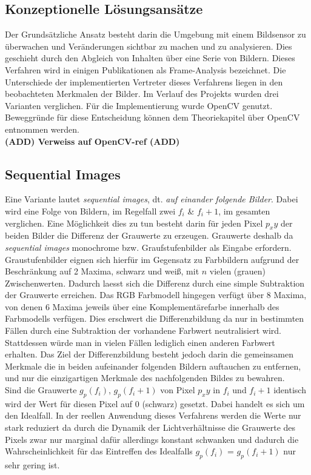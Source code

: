 		\subsection{Konzeptionelle Lösungsansätze}
		Der Grundsätzliche Ansatz besteht darin die Umgebung mit einem Bildsensor zu überwachen und Veränderungen sichtbar zu machen und zu analysieren. Dies geschieht durch den Abgleich von Inhalten über eine Serie von Bildern. Dieses Verfahren wird in einigen Publikationen als Frame-Analysis bezeichnet. Die Unterschiede der implementierten Vertreter dieses Verfahrens liegen in den beobachteten Merkmalen der Bilder. Im Verlauf des Projekts wurden drei Varianten verglichen. Für die Implementierung wurde OpenCV genutzt. Beweggründe für diese Entscheidung können dem Theoriekapitel über OpenCV entnommen werden.\\
		\textbf{(ADD) Verweiss auf OpenCV-ref (ADD)}
		\subsection{Sequential Images}
		Eine Variante lautet \textit{sequential images}, dt. \textit{auf einander folgende Bilder}. Dabei wird eine Folge von Bildern, im Regelfall zwei $f_i$ \& $f_i+1$, im gesamten verglichen. Eine Möglichkeit dies zu tun besteht darin für jeden Pixel $p_xy$ der beiden Bilder die Differenz der Grauwerte zu erzeugen. Grauwerte deshalb da \textit{sequential images} monochrome bzw. Graufstufenbilder als Eingabe erfordern. Graustufenbilder eignen sich hierfür im Gegensatz zu Farbbildern aufgrund der Beschränkung auf 2 Maxima, schwarz und weiß, mit $n$ vielen (grauen) Zwischenwerten. Dadurch laesst sich die Differenz durch eine simple Subtraktion der Grauwerte erreichen. Das RGB Farbmodell hingegen verfügt über 8 Maxima, von denen 6 Maxima jeweils über eine Komplementärefarbe innerhalb des Farbmodells verfügen. Dies erschwert die Differenzbildung da nur in bestimmten Fällen durch eine Subtraktion der vorhandene Farbwert neutralisiert wird. Stattdessen würde man in vielen Fällen lediglich einen anderen Farbwert erhalten. Das Ziel der Differenzbildung besteht jedoch darin die gemeinsamen Merkmale die in beiden aufeinander folgenden Bildern auftauchen zu entfernen, und nur die einzigartigen Merkmale des nachfolgenden Bildes zu bewahren.\\
		Sind die Grauwerte $g_p(f_i)$, $g_p(f_i+1)$ von Pixel $p_xy$ in $f_i$ und $f_i+1$ identisch wird der Wert für diesen Pixel auf 0 (schwarz) gesetzt. Dabei handelt es sich um den Idealfall. In der reellen Anwendung dieses Verfahrens werden die Werte nur stark reduziert da durch die Dynamik der Lichtverhältnisse die Grauwerte des Pixels zwar nur marginal dafür allerdings konstant schwanken und dadurch die Wahrscheinlichkeit für das Eintreffen des Idealfalls $g_p(f_i)$ = $g_p(f_i+1)$ nur sehr gering ist.
		
